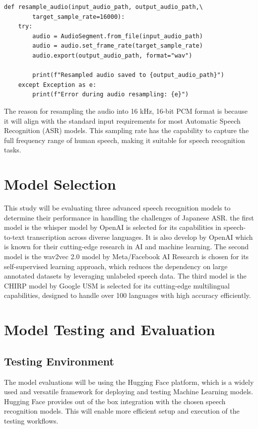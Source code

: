 \begin{lstlisting}[caption={Python code to resample audio to 16 kHz using pydub}]
    def resample_audio(input_audio_path, output_audio_path,\
        target_sample_rate=16000):
    try:
        audio = AudioSegment.from_file(input_audio_path)
        audio = audio.set_frame_rate(target_sample_rate)
        audio.export(output_audio_path, format="wav")
        
        print(f"Resampled audio saved to {output_audio_path}")
    except Exception as e:
        print(f"Error during audio resampling: {e}")
\end{lstlisting}
The reason for resampling the audio into 16 kHz, 16-bit PCM format is because it will align with the standard input requirements for most Automatic Speech Recognition (ASR) models. This sampling rate has the capability to capture the full frequency range of human speech, making it suitable for speech recognition tasks.


\section{Model Selection}
This study will be evaluating three advanced speech recognition models to determine their performance in handling the challenges of Japanese ASR. the first model is the whisper model by OpenAI is selected for its capabilities in speech-to-text transcription across diverse languages. It is also develop by OpenAI which is known for their cutting-edge research in AI and machine learning. The second model is the wav2vec 2.0 model by Meta/Facebook AI Research is chosen for its self-supervised learning approach, which reduces the dependency on large annotated datasets by leveraging unlabeled speech data. The third model is the CHIRP model by Google USM is selected for its cutting-edge multilingual capabilities, designed to handle over 100 languages with high accuracy efficiently.

\section{Model Testing and Evaluation}
\subsection{Testing Environment}
The model evaluations will be using the Hugging Face platform, which is a widely used and versatile framework for deploying and testing Machine Learning models. Hugging Face provides out of the box integration with the chosen speech recognition models. This will enable more efficient setup and execution of the testing workflows.

